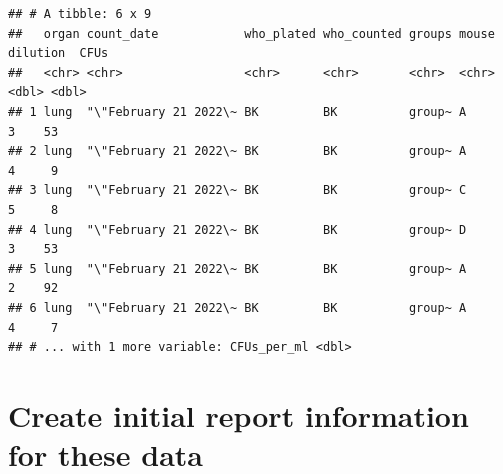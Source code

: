 \documentclass[
]{book}
\begin{document}
\begin{verbatim}
## # A tibble: 6 x 9
##   organ count_date            who_plated who_counted groups mouse dilution  CFUs
##   <chr> <chr>                 <chr>      <chr>       <chr>  <chr>    <dbl> <dbl>
## 1 lung  "\"February 21 2022\~ BK         BK          group~ A            3    53
## 2 lung  "\"February 21 2022\~ BK         BK          group~ A            4     9
## 3 lung  "\"February 21 2022\~ BK         BK          group~ C            5     8
## 4 lung  "\"February 21 2022\~ BK         BK          group~ D            3    53
## 5 lung  "\"February 21 2022\~ BK         BK          group~ A            2    92
## 6 lung  "\"February 21 2022\~ BK         BK          group~ A            4     7
## # ... with 1 more variable: CFUs_per_ml <dbl>
\end{verbatim}

\hypertarget{create-initial-report-information-for-these-data}{%
\section{Create initial report information for these data}\label{create-initial-report-information-for-these-data}}
\end{document}

